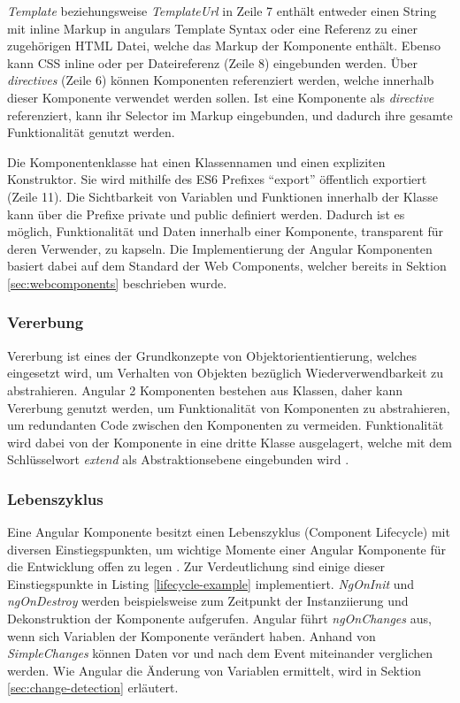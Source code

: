 \emph{Template} beziehungsweise \emph{TemplateUrl} in Zeile 7 enthält entweder einen String mit inline Markup in angulars Template Syntax
oder eine Referenz zu einer zugehörigen HTML Datei, welche das Markup der Komponente enthält.
Ebenso kann \ac{CSS} inline oder per Dateireferenz (Zeile 8) eingebunden werden.
Über \emph{directives} (Zeile 6) können Komponenten referenziert werden, welche innerhalb dieser Komponente verwendet werden sollen.
Ist eine Komponente als \emph{directive} referenziert,
kann ihr Selector im Markup eingebunden,
und dadurch ihre gesamte Funktionalität genutzt werden.

Die Komponentenklasse hat einen Klassennamen und einen expliziten Konstruktor.
Sie wird mithilfe des ES6 Prefixes ``export'' öffentlich exportiert (Zeile 11).
Die Sichtbarkeit von Variablen und Funktionen innerhalb der Klasse kann über die Prefixe private und public definiert werden.
Dadurch ist es möglich, Funktionalität und Daten innerhalb einer Komponente, transparent für deren Verwender, zu kapseln.
Die Implementierung der Angular Komponenten basiert dabei auf dem Standard der Web Components, welcher bereits in Sektion \ref{sec:webcomponents} beschrieben wurde.

\newpage




\subsubsection{Vererbung}

Vererbung ist eines der Grundkonzepte von Objektorientientierung,
welches eingesetzt wird, um Verhalten von Objekten bezüglich Wiederverwendbarkeit zu
abstrahieren. Angular 2 Komponenten bestehen aus Klassen, daher
kann Vererbung genutzt werden, um Funktionalität von Komponenten zu abstrahieren,
um redundanten Code zwischen den Komponenten
zu vermeiden. Funktionalität wird dabei von der Komponente in eine dritte Klasse ausgelagert,
welche mit dem Schlüsselwort \emph{extend} als
Abstraktionsebene eingebunden wird \cite{DanWa45:online}.

\subsubsection{Lebenszyklus}
Eine Angular Komponente besitzt einen Lebenszyklus (Component Lifecycle) mit diversen Einstiegspunkten,
um wichtige Momente einer Angular Komponente für die Entwicklung offen zu legen \cite[837-839]{ng-Book-2}.
Zur Verdeutlichung sind einige dieser Einstiegspunkte in Listing \ref{lifecycle-example} implementiert.
\emph{NgOnInit} und \emph{ngOnDestroy} werden beispielsweise zum Zeitpunkt der Instanziierung und Dekonstruktion der Komponente aufgerufen.
Angular führt \emph{ngOnChanges} aus, wenn sich Variablen der Komponente verändert haben. Anhand von \emph{SimpleChanges}
können Daten vor und nach dem Event miteinander verglichen werden.
Wie Angular die Änderung von Variablen ermittelt, wird in Sektion \ref{sec:change-detection} erläutert.

